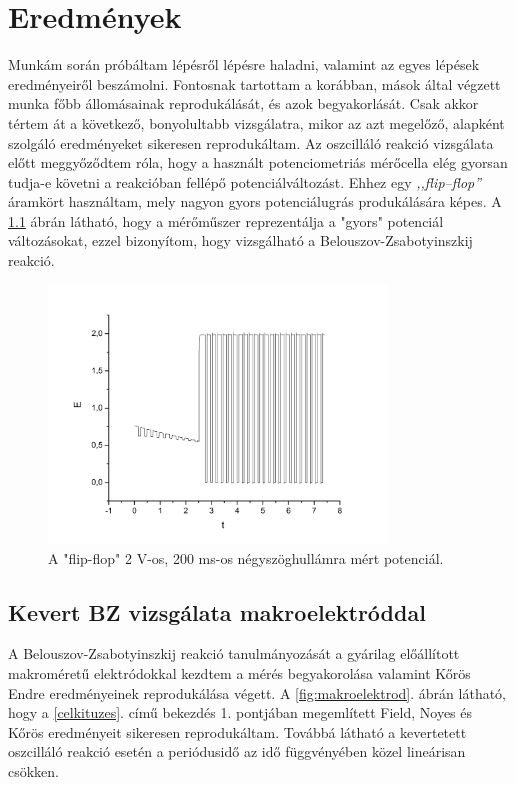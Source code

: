 \chapter{Eredmények}
\pagestyle{headings}

\def\s{0.5}
Munkám során próbáltam lépésről lépésre haladni, valamint az egyes lépések eredményeiről beszámolni. Fontosnak tartottam a korábban, mások által végzett munka főbb állomásainak reprodukálását, és azok begyakorlását. Csak akkor tértem át a következő, bonyolultabb vizsgálatra, mikor az azt megelőző, alapként szolgáló eredményeket sikeresen reprodukáltam. Az oszcilláló reakció vizsgálata előtt meggyőződtem róla, hogy a használt potenciometriás mérőcella elég gyorsan tudja-e követni a reakcióban fellépő potenciálváltozást. Ehhez egy \emph{,,flip--flop''} áramkört használtam, mely nagyon gyors potenciálugrás produkálására képes. A \ref{fig:square} ábrán látható, hogy a mérőműszer reprezentálja a "gyors" potenciál változásokat, ezzel bizonyítom, hogy vizsgálható a Belouszov-Zsabotyinszkij reakció.

\begin{figure}
\centering
\includegraphics[width=0.8\textwidth]{img/square.jpg}
\caption{A "flip-flop" 2 V-os, 200 ms-os négyszöghullámra mért potenciál.}
\label{fig:square}
\end{figure}

\section{Kevert BZ vizsgálata makroelektróddal}
A Belouszov-Zsabotyinszkij reakció tanulmányozását a gyárilag előállított makroméretű elektródokkal kezdtem a mérés begyakorolása valamint Kőrös Endre eredményeinek \cite{noyes1972oscillations} reprodukálása végett. 
A \ref{fig:makroelektrod}. ábrán látható, hogy a \ref{celkituzes}. című bekezdés 1. pontjában megemlített Field, Noyes és Kőrös eredményeit \cite{noyes1972oscillations} sikeresen reprodukáltam. Továbbá látható a kevertetett oszcilláló reakció esetén a periódusidő az idő függvényében közel lineárisan csökken. 

